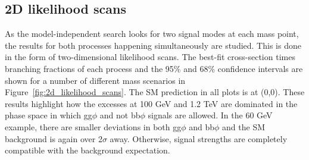 \subsection{2D likelihood scans}

As the model-independent search looks for two signal modes at each mass point, the results for both processes happening simultaneously are studied.
This is done in the form of two-dimensional likelihood scans.
The best-fit cross-section times branching fractions of each process and the 95\% and 68\% confidence intervals are shown for a number of different mass scenarios in Figure~\ref{fig:2d_likelihood_scans}.
The \ac{SM} prediction in all plots is at (0,0).
These results highlight how the excesses at 100 GeV and 1.2 TeV are dominated in the phase space in which gg$\phi$ and not bb$\phi$ signals are allowed.
In the 60 GeV example, there are smaller deviations in both gg$\phi$ and bb$\phi$ and the SM background is again over 2$\sigma$ away.
Otherwise, signal strengths are completely compatible with the background expectation.


